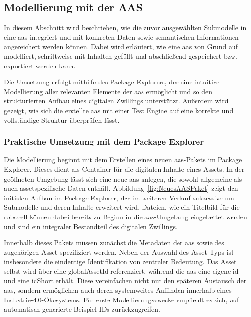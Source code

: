 \subsection{Modellierung mit der AAS}
In diesem Abschnitt wird beschrieben, wie die zuvor ausgewählten Submodelle in eine \acs{aas} integriert und mit konkreten Daten sowie semantischen Informationen angereichert werden können.
Dabei wird erläutert, wie eine \acs{aas} von Grund auf modelliert, schrittweise mit Inhalten gefüllt und abschließend gespeichert bzw. exportiert werden kann.  

Die Umsetzung erfolgt mithilfe des Package Explorers, der eine intuitive Modellierung aller relevanten Elemente der \acs{aas} ermöglicht und so den strukturierten Aufbau eines digitalen Zwillings unterstützt.
Außerdem wird gezeigt, wie sich die erstellte \acs{aas} mit einer Test Engine auf eine korrekte und vollständige Struktur überprüfen lässt.

\subsubsection{Praktische Umsetzung mit dem Package Explorer}

Die Modellierung beginnt mit dem Erstellen eines neuen \acs{aas}-Pakets im Package Explorer.
Dieses dient als Container für die digitalen Inhalte eines Assets.  
In der geöffneten Umgebung lässt sich eine neue \acs{aas} anlegen, die sowohl allgemeine als auch assetspezifische Daten enthält. 
Abbildung~\ref{fig:NeuesAASPaket} zeigt den initialen Aufbau im Package Explorer, der im weiteren Verlauf sukzessive um Submodelle und deren Inhalte erweitert wird.
Dateien, wie ein Titelbild für die robocell können dabei bereits zu Beginn in die \acs{aas}-Umgebung eingebettet werden und sind ein integraler Bestandteil des digitalen Zwillings.

Innerhalb dieses Pakets müssen zunächst die Metadaten der \acs{aas} sowie des zugehörigen Asset spezifiziert werden.
Neben der Auswahl des Asset-Typs ist insbesondere die eindeutige Identifikation von zentraler Bedeutung.
Das Asset selbst wird über eine globalAssetId referenziert, während die \acs{aas} eine eigene \acs{id} und eine idShort erhält.
Diese vereinfachen nicht nur den späteren Austausch der \acs{aas}, sondern ermöglichen auch deren systemweites Auffinden innerhalb eines Industrie-4.0-Ökosystems.
Für erste Modellierungszwecke empfiehlt es sich, auf automatisch generierte Beispiel-IDs zurückzugreifen.

